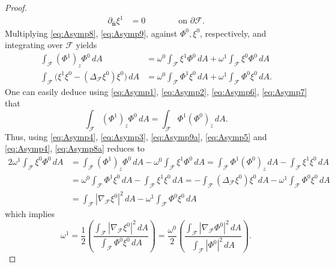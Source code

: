 \documentclass[letterpaper, 12pt]{amsart}
\newcommand{\F}{\mathcal{F}}
\newcommand{\n}{\mathbf{\hat{n}}}
\begin{document}
\begin{proof}
\begin{subequations}
\begin{alignat}{2}
\label{eq:Asymp10} \partial_\n\xi^1 & = 0 && \qquad\textrm{ on }\partial\F.
\end{alignat}
\end{subequations}
Multiplying \eqref{eq:Asymp8}, \eqref{eq:Asymp9}, against $\Phi^0, \xi^0$, respectively, and integrating over $\F$ yields
\begin{align}
\label{eq:Asymp8a} \int_\F (\Phi^1)_z\Phi^0\, dA & = \omega^0\int_\F\xi^1\Phi^0\, dA + \omega^1\int_\F \xi^0\Phi^0\, dA \\
\label{eq:Asymp9a} \int_\F \Big(\xi^1\xi^0 - (\Delta_\F\xi^0)\xi^0\Big) \, dA & = \omega^0\int_\F \Phi^1\xi^0\, dA + \omega^1\int_\F \Phi^0\xi^0\, dA.
\end{align}
One can easily deduce using \eqref{eq:Asymp1}, \eqref{eq:Asymp2}, \eqref{eq:Asymp6}, \eqref{eq:Asymp7} that
\[ \int_\F(\Phi^1)_z\Phi^0\, dA = \int_\F\Phi^1(\Phi^0)_z\, dA. \]
Thus, using \eqref{eq:Asymp4}, \eqref{eq:Asymp3}, \eqref{eq:Asymp9a}, \eqref{eq:Asymp5} and \eqref{eq:Asymp4}, \eqref{eq:Asymp8a} reduces to
\begin{alignat*}{2}
\omega^1\int_\F\xi^0\Phi^0\, dA & = \int_\F(\Phi^1)_z\Phi^0\, dA - \omega^0\int_\F\xi^1\Phi^0\, dA = \int_\F\Phi^1(\Phi^0)_z\, dA - \int_\F\xi^1\xi^0\, dA \\
& = \omega^0\int_\F\Phi^1\xi^0\, dA - \int_\F\xi^1\xi^0\, dA  = -\int_\F (\Delta_\F\xi^0)\xi^0\, dA - \omega^1\int_\F \Phi^0\xi^0\, dA \\
& = \int_\F |\nabla_\F\xi^0|^2\, dA - \omega^1\int_\F \Phi^0\xi^0\, dA 
\end{alignat*}
which implies
\[ \omega^1   = \frac{1}{2}\left(\dfrac{\int_\F|\nabla_\F\xi^0|^2\, dA}{\int_\F\Phi^0\xi^0\, dA}\right) = \frac{\omega^0}{2}\left(\dfrac{\int_\F|\nabla_\F\Phi^0|^2\, dA}{\int_\F |\Phi^0|^2\, dA}\right). \]
\end{proof}
\end{document}
